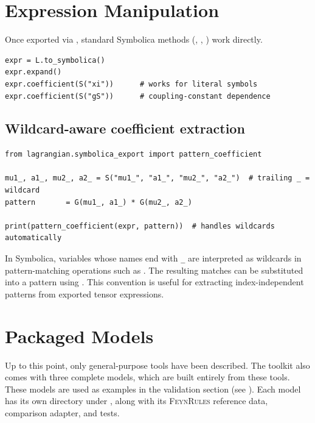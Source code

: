 \section{Expression Manipulation}
\label{sec:feynpy-expr-manip}

Once exported via , standard Symbolica methods
(, , ) work directly.

\begin{verbatim}
expr = L.to_symbolica()
expr.expand()
expr.coefficient(S("xi"))      # works for literal symbols
expr.coefficient(S("gS"))      # coupling-constant dependence
\end{verbatim}

\subsection*{Wildcard-aware coefficient extraction}

\begin{verbatim}
from lagrangian.symbolica_export import pattern_coefficient

mu1_, a1_, mu2_, a2_ = S("mu1_", "a1_", "mu2_", "a2_")  # trailing _ = wildcard
pattern       = G(mu1_, a1_) * G(mu2_, a2_)

print(pattern_coefficient(expr, pattern))  # handles wildcards automatically
\end{verbatim}



\begin{tcolorbox}[infobox, title={Wildcard convention}]
In Symbolica, variables whose names end with \texttt{\_} are interpreted as
wildcards in pattern-matching operations such as . The
resulting matches can be substituted into a pattern using
. This convention is useful for extracting
index-independent patterns from exported tensor expressions.
\end{tcolorbox}

\section{Packaged Models}
\label{sec:feynpy-models}

Up to this point, only general-purpose tools have been described. The toolkit also comes with three complete models, which are built entirely from these tools. These models are used as examples in the validation section (see ). Each model has its own directory under , along with its \textsc{FeynRules} reference data, comparison adapter, and tests.

